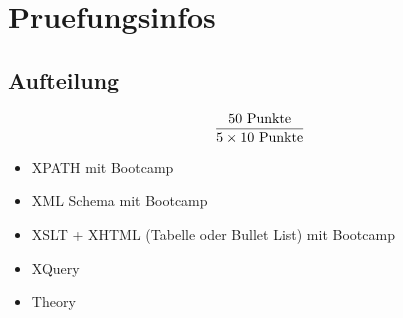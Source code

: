 \chapter{Pruefungsinfos}
\section{Aufteilung}
\[
\frac{50 \textnormal{ Punkte}}{5 \times 10 \textnormal{ Punkte}}
\]

\begin{itemize}
\item XPATH mit Bootcamp
\item XML Schema mit Bootcamp
\item XSLT + XHTML (Tabelle oder Bullet List) mit Bootcamp
\item XQuery
\item Theory
\end{itemize}
